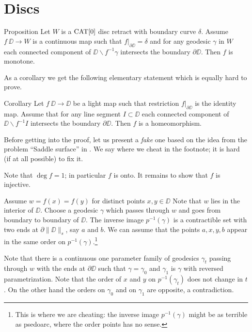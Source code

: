 \section{Discs}


\begin{thm}{Proposition}\label{prop:mono-disc}
Let $W$ is a $\mathop{\rm CAT}\nolimits[0]$ disc retract with boundary curve $\delta$.
Assume $f\:\DD\to W$ is a continuous map such that $f|_{\partial\DD}=\delta$ 
and for any geodesic $\gamma$ in $W$ each connected component of $\DD\backslash f^{-1}\gamma$ intersects the boundary $\partial \DD$.
Then $f$ is monotone.
\end{thm}

As a corollary we get the following elementary statement which is equally hard to prove.

\begin{thm}{Corollary}
Let $f\:\DD\to \DD$ be a light map such that restriction $f|_{\partial\DD}$ is the identity map.
Assume that for any line segment $I\subset \DD$ each connected component of $\DD\backslash f^{-1}I$ intersects the boundary $\partial \DD$.
Then $f$ is a homeomorphism.
\end{thm}

Before getting into the proof, let us present a \emph{fake} one based on the idea from the problem ``Saddle surface'' in \cite{petrunin-orthodox}.
We say where we cheat in the footnote; 
it is hard (if at all possible) to fix it.

Note that  $\deg f=1$;
in particular $f$ is onto.
It remains to show that $f$ is injective.

Assume  $w=f(x)=f(y)$ for distinct points $x,y\in\DD$
Note that  $w$ lies in the interior of $\DD$.
Choose a geodesic $\gamma$ which passes through $w$ and goes 
from boundary to boundary of $\DD$.
The inverse image $p^{-1}(\gamma)$ is a contractible set with two ends at $\partial\|\DD\|_s$, say $a$ and $b$.
We can assume that the points $a,x,y,b$ appear in the same order on $p^{-1}(\gamma)$.\footnote{This is where we are cheating: the inverse image $p^{-1}(\gamma)$ might be as terrible as psedoarc, where the order points has no sense.}

Note that there is a continuous one parameter family of geodesics $\gamma_t$ passing through $w$ with the ends at $\partial \DD$
such that $\gamma=\gamma_0$ and $\gamma_1$ is $\gamma$ with reversed parametrization.
Note that the order of $x$ and $y$ on $p^{-1}(\gamma_t)$ does not change in $t$.
On the other hand the orders on $\gamma_0$ and on $\gamma_1$ are opposite, a contradiction.\qeds

